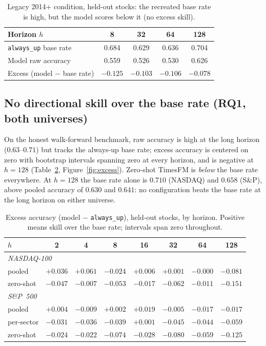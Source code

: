 \documentclass[11pt]{article}
\newcommand{\alwaysup}{\texttt{always\_up}}
\begin{document}
\begin{table}[H]
\centering
\caption{Legacy 2014+ condition, held-out stocks: the recreated base rate is high, but
the model scores below it (no excess skill).}
\label{tab:legacy}
\begin{tabular}{lcccc}
\toprule
Horizon $h$ & 8 & 32 & 64 & 128 \\
\midrule
\alwaysup{} base rate & 0.684 & 0.629 & 0.636 & 0.704 \\
Model raw accuracy    & 0.559 & 0.526 & 0.530 & 0.626 \\
Excess (model $-$ base rate) & $-0.125$ & $-0.103$ & $-0.106$ & $-0.078$ \\
\bottomrule
\end{tabular}
\end{table}

\subsection{No directional skill over the base rate (RQ1, both universes)}
On the honest walk-forward benchmark, raw accuracy is high at the long horizon
($0.63$--$0.71$) but tracks the always-up base rate; excess accuracy is centered on
zero with bootstrap intervals spanning zero at every horizon, and is negative at
$h=128$ (Table~\ref{tab:excess}, Figure~\ref{fig:excess}). Zero-shot TimesFM is
\emph{below} the base rate everywhere. At $h=128$ the base rate alone is $0.710$
(NASDAQ) and $0.658$ (S\&P), above pooled accuracy of $0.630$ and $0.641$: no
configuration beats the base rate at the long horizon on either universe.

\begin{table}[H]
\centering
\caption{Excess accuracy (model $-$ \alwaysup{}), held-out stocks, by horizon.
Positive means skill over the base rate; intervals span zero throughout.}
\label{tab:excess}
\begin{tabular}{lccccccc}
\toprule
$h$ & 2 & 4 & 8 & 16 & 32 & 64 & 128 \\
\midrule
\multicolumn{8}{l}{\textit{NASDAQ-100}}\\
\quad pooled    & $+0.036$ & $+0.061$ & $-0.024$ & $+0.006$ & $+0.001$ & $-0.000$ & $-0.081$ \\
\quad zero-shot & $-0.047$ & $-0.007$ & $-0.053$ & $-0.017$ & $-0.062$ & $-0.011$ & $-0.151$ \\
\multicolumn{8}{l}{\textit{S\&P~500}}\\
\quad pooled     & $+0.004$ & $-0.009$ & $+0.002$ & $+0.019$ & $-0.005$ & $-0.017$ & $-0.017$ \\
\quad per-sector & $-0.031$ & $-0.036$ & $-0.039$ & $+0.001$ & $-0.045$ & $-0.044$ & $-0.059$ \\
\quad zero-shot  & $-0.024$ & $-0.022$ & $-0.074$ & $-0.028$ & $-0.080$ & $-0.059$ & $-0.125$ \\
\bottomrule
\end{tabular}
\end{table}
\end{document}
